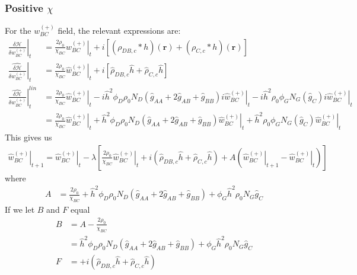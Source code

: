 \documentclass{article}
\begin{document}
    \subsubsection{Positive $\chi$}
  For the $w_{BC}^{(+)}$ field, the relevant expressions are:
  \begin{align*}
    \left. \frac{\delta \mathcal{H}}{\delta  w_{BC}^{(+)} } \right|_t &=
      \frac{2\rho_0}{\chi_{BC}} \left. w_{BC}^{(+)} \right|_t
      + i [ (\rho_{DB,c} \ast h)(\mathbf{r})
            + (\rho_{C,c} \ast h)(\mathbf{r}) ] \\
      \left. \hat{\frac{\delta \mathcal{H}}{\delta w_{BC}^{(+)}}} \right|_t &=
      \frac{2\rho_0}{\chi_{BC}} \left. \hat{w}_{BC}^{(+)} \right|_t
      + i [ \hat{\rho}_{DB,c} \hat{h}
            + \hat{\rho}_{C,c} \hat{h} ] \\
    \left. \hat{\frac{\delta \mathcal{H}}{\delta w_{BC}^{(+)}}} \right| ^{lin}_t &=
      \frac{2\rho_0}{\chi_{BC}} \left. \hat{w}_{BC}^{(+)} \right|_t
      - i \hat{h}^2 \phi_D \rho_0 N_D
        (\hat{g}_{AA} +  2 \hat{g}_{AB} + \hat{g}_{BB} ) i \left.
          \hat{w}_{BC}^{(+)} \right|_t - i \hat{h} ^2  {\rho}_0  
          \left. \phi_G N_G (\hat{g}_{C}) i \hat{w}_{BC}^{(+)} \right|_t
          \\
    &= \frac{2\rho_0}{\chi_{BC}} \left. \hat{w}_{BC}^{(+)} \right|_t
      + \hat{h}^2 \phi_D \rho_0 N_D
        (\hat{g}_{AA} + 2 \hat{g}_{AB} + \hat{g}_{BB})
          \left. \hat{w}_{BC}^{(+)} \right|_t + 
          \hat{h} ^2  {\rho}_0  \left. \phi_G N_G (\hat{g}_{C})  \hat{w}_{BC}^{(+)} \right|_t
  \end{align*}
  This gives us
  \begin{align*}
    \left. \hat{w}_{BC}^{(+)} \right|_{t+1} =
      \left. \hat{w}_{BC}^{(+)} \right|_t - \lambda \left[
        \frac{2\rho_0}{\chi_{BC}} \left. \hat{w}_{BC}^{(+)} \right|_t
        + i ( \hat{\rho}_{DB,c} \hat{h}
              + \hat{\rho}_{C,c} \hat{h} )
        + A ( \left. \hat{w}_{BC}^{(+)} \right|_{t+1}
              - \left. \hat{w}_{BC}^{(+)} \right|_t)
      \right]
  \end{align*}
  where
  \begin{align*}
    A &=
    \frac{2\rho_0}{\chi_{BC}}
        + \hat{h}^2 \phi_D \rho_0 N_D
          (\hat{g}_{AA} + 2 \hat{g}_{AB} + \hat{g}_{BB}) + \phi_G   \hat{h}^2  \rho_0 N_G 
          \hat{g}_{C}
  \end{align*}
  If we let $B$ and $F$ equal
  \begin{align*}
    B &= A - \frac{2\rho_0}{\chi_{BC}} \\
      &= \hat{h}^2 \phi_D \rho_0 N_D
          (\hat{g}_{AA} + 2 \hat{g}_{AB} + \hat{g}_{BB}) 
          + \phi_G   \hat{h}^2  \rho_0 N_G 
          \hat{g}_{C}\\
    F &= + i ( \hat{\rho}_{DB,c} \hat{h}
              + \hat{\rho}_{C,c} \hat{h} )
  \end{align*}
\end{document}

